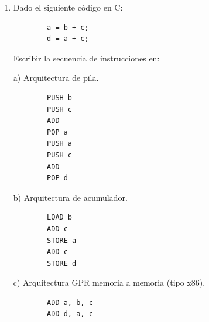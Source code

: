 \documentclass[a4paper, 11pt]{article}
\newcommand{\Pspace}{0.5cm}
\newcommand{\Aspace}{0.2cm}
\begin{document}
\begin{enumerate}
        \vspace{\Aspace} \par
        b) Si una instrucción tipo R necesita 3 registros, ¿cuántos bits quedan para el opcode y campos adicionales?
        \\ { \color{azul} 
            3 registros equivalen a 18 bits, y dado que el tamaño de nuestras instrucciones es de 4 bytes que son 32 bits, entonces nos quedan $32 - 18 = 14$ bits para el opcode y campos adicionales.
        }

        \vspace{\Aspace} \par
        c) ¿Cuál es la ventaja de usar longitud fija?
        \\ { \color{azul} 
            Como el procesador sabe que cada instrucción mide lo mismo, puede empezar a buscar la siguiente instrucción antes de terminar la actual.
        }



    \vspace{\Pspace}
    \item Dado el siguiente código en C:
    \begin{verbatim}
        a = b + c;
        d = a + c;
    \end{verbatim}
    Escribir la secuencia de instrucciones en:
        \vspace{\Aspace} \par
        a) Arquitectura de pila.
        { \color{azul} 
            \begin{verbatim}
        PUSH b
        PUSH c
        ADD
        POP a
        PUSH a
        PUSH c
        ADD
        POP d
            \end{verbatim}
        }

        \vspace{\Aspace} \par
        b) Arquitectura de acumulador.
        { \color{azul} 
            \begin{verbatim}
        LOAD b
        ADD c
        STORE a
        ADD c
        STORE d
            \end{verbatim}
        }

        \vspace{\Aspace} \par
        c) Arquitectura GPR memoria a memoria (tipo x86).
        { \color{azul} 
            \begin{verbatim}
        ADD a, b, c
        ADD d, a, c
            \end{verbatim}
        }




\end{enumerate}
\end{document}
